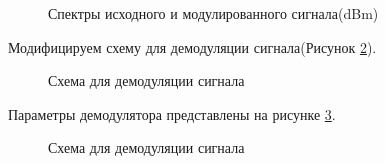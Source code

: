 \documentclass[a4paper,14pt]{extarticle}
\begin{document}
\begin{figure}[H]
\caption{Спектры исходного и модулированного сигнала(dBm)}
\label{16}
\end{figure}

Модифицируем схему для демодуляции сигнала(Рисунок \ref{17}).

\begin{figure}[H]
\caption{Схема для демодуляции сигнала}
\label{17}
\end{figure}

Параметры демодулятора представлены на рисунке \ref{18}.

\begin{figure}[H]
\caption{Схема для демодуляции сигнала}
\label{18}
\end{figure}
\end{document}
